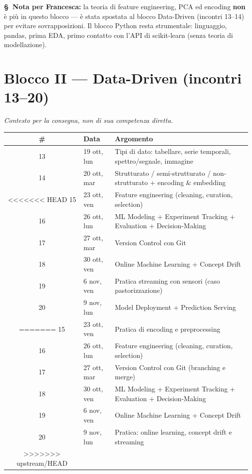 \documentclass[11pt,a4paper]{article}
\newcommand{\flag}[1]{{\small\color{coursegold}\bfseries \S\ #1}}
\begin{document}
\vspace{0.4em}
\flag{Nota per Francesca:} la teoria di feature engineering, PCA ed encoding \textbf{non} è più in questo blocco --- è stata spostata al blocco Data-Driven (incontri 13--14) per evitare sovrapposizioni. Il blocco Python resta strumentale: linguaggio, pandas, prima EDA, primo contatto con l'API di scikit-learn (senza teoria di modellazione).

\section{Blocco II --- Data-Driven (incontri 13--20)}
\textit{Contesto per la consegna, non di sua competenza diretta.}

\begin{center}
\begin{tabularx}{\textwidth}{@{}c l X@{}}
\toprule
\textbf{\#} & \textbf{Data} & \textbf{Argomento} \\
\midrule
13 & 19 ott, lun & Tipi di dato: tabellare, serie temporali, spettro/segnale, immagine \\
14 & 20 ott, mar & Strutturato / semi-strutturato / non-strutturato + encoding \& embedding \\
<<<<<<< HEAD
15 & 23 ott, ven & Feature engineering (cleaning, curation, selection) \\
16 & 26 ott, lun & ML Modeling + Experiment Tracking + Evaluation + Decision-Making \\
17 & 27 ott, mar & Version Control con Git \\
18 & 30 ott, ven & Online Machine Learning + Concept Drift \\
19 & 6 nov, ven & Pratica streaming con sensori (caso pastorizzazione) \\
20 & 9 nov, lun & Model Deployment + Prediction Serving \\
=======
15 & 23 ott, ven & Pratica di encoding e preprocessing \\
16 & 26 ott, lun & Feature engineering (cleaning, curation, selection) \\
17 & 27 ott, mar & Version Control con Git (branching e merge) \\
18 & 30 ott, ven & ML Modeling + Experiment Tracking + Evaluation + Decision-Making \\
19 & 6 nov, ven & Online Machine Learning + Concept Drift \\
20 & 9 nov, lun & Pratica: online learning, concept drift e streaming \\
>>>>>>> upstream/HEAD
\bottomrule
\end{tabularx}
\end{center}
\end{document}
